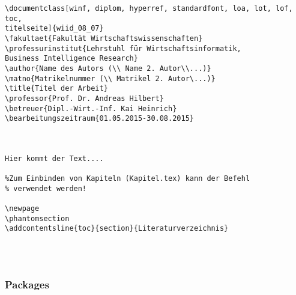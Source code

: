 \begin{verbatim}
\documentclass[winf, diplom, hyperref, standardfont, loa, lot, lof, toc,
titelseite]{wiid_08_07}
\fakultaet{Fakultät Wirtschaftswissenschaften}
\professurinstitut{Lehrstuhl für Wirtschaftsinformatik,
Business Intelligence Research}
\author{Name des Autors (\\ Name 2. Autor\\...)}
\matno{Matrikelnummer (\\ Matrikel 2. Autor\...)}
\title{Titel der Arbeit}
\professor{Prof. Dr. Andreas Hilbert}
\betreuer{Dipl.-Wirt.-Inf. Kai Heinrich}
\bearbeitungszeitraum{01.05.2015-30.08.2015}



Hier kommt der Text....

%Zum Einbinden von Kapiteln (Kapitel.tex) kann der Befehl
% verwendet werden!

\newpage
\phantomsection
\addcontentsline{toc}{section}{Literaturverzeichnis}




\end{verbatim}

\subsubsection{Packages}
\label{chap:packages}

